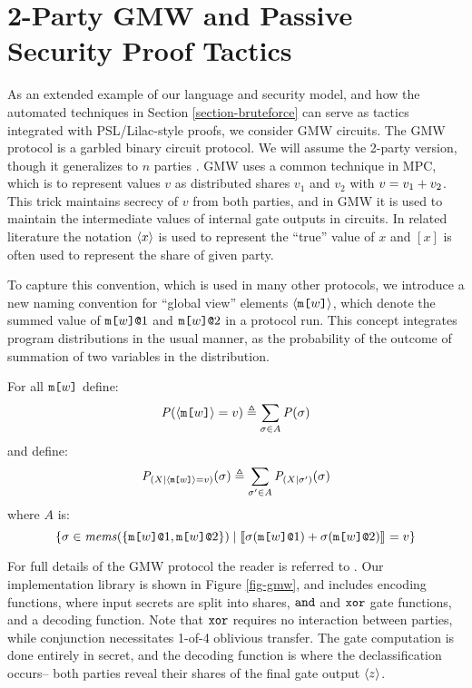 \section{2-Party GMW and Passive Security Proof Tactics}
\label{section-metalang-gmw}
\label{section-example-gmw}



As an extended example of our language and security model, and how the
automated techniques in Section \ref{section-bruteforce} can serve
as tactics integrated with PSL/Lilac-style proofs, we consider GMW
circuits.  The GMW protocol is a garbled binary circuit protocol.  We
will assume the 2-party version, though it generalizes to $n$
parties \cite{goldreich2019play}. GMW uses a common technique in MPC, which is to
represent values $v$ as distributed shares $v_1$ and $v_2$ with $v =
v_1 + v_2$. This trick maintains secrecy of $v$ from both
parties, and in GMW it is used to maintain the intermediate values of
internal gate outputs in circuits. In related literature the notation
$\langle x \rangle$ is used to represent the ``true'' value of $x$ and $[x]$
is often used to represent the share of given party.

To capture this convention, which is used in many other protocols, we
introduce a new naming convention for ``global view'' elements
$\langle \texttt{m[}w\texttt{]} \rangle$, which denote the summed value of
$\texttt{m[}w\texttt{]}\texttt{@}1$ and $\texttt{m[}w\texttt{]}\texttt{@}2$ in a protocol
run. This concept integrates program distributions in the
usual manner, as the probability of the outcome of summation
of two variables in the distribution.
\begin{definition}
  For all $\texttt{m[}w\texttt{]}$ define:
  $$\mathit{P}(\langle \texttt{m[}w\texttt{]} \rangle = v) \triangleq \sum_{\sigma \in A} \mathit{P}(\sigma)$$
  and define:
  $$\mathit{P}_{({X}|{\langle \texttt{m[}w\texttt{]} \rangle = v})}(\sigma) \triangleq  \sum_{\sigma' \in A} \mathit{P}_{({X}|{\sigma'})}(\sigma)$$
  where $A$ is:
  $$\{ \sigma \in \mathit{mems}(\{ \texttt{m[}w\texttt{]}\texttt{@}1,\texttt{m[}w\texttt{]}\texttt{@}2 \} ) \mid
      \llbracket \sigma(\texttt{m[}w\texttt{]}\texttt{@}1) + \sigma(\texttt{m[}w\texttt{]}\texttt{@}2) \rrbracket_{} = v \}$$
\end{definition}

For full details of the GMW protocol the reader is referred to
\cite{evans2018pragmatic}. Our implementation library is shown in
Figure \ref{fig-gmw}, and includes encoding functions, where
input secrets are split into shares, $\texttt{and}$ and $\texttt{xor}$ gate
functions, and a decoding function. Note that $\texttt{xor}$ requires
no interaction between parties, while conjunction necessitates
1-of-4 oblivious transfer. The gate computation is
done entirely in secret, and the decoding function
is where the declassification occurs-- both parties reveal
their shares of the final gate output $\langle z \rangle$.


